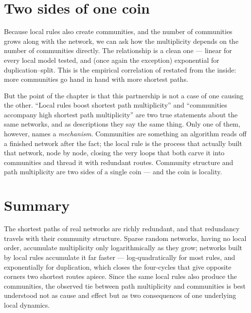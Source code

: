 \section{Two sides of one coin}

Because local rules also create communities, and the number of communities grows
along with the network, we can ask how the multiplicity depends on the number of
communities directly. The relationship is a clean one --- linear for every local
model tested, and (once again the exception) exponential for duplication--split.
This is the empirical correlation of \citet{deng2026} restated from the inside:
more communities go hand in hand with more shortest paths.

But the point of the chapter is that this partnership is not a case of one
causing the other. ``Local rules boost shortest path multiplicity'' and
``communities accompany high shortest path multiplicity'' are two true statements
about the same networks, and as descriptions they say the same thing. Only one of
them, however, names a \emph{mechanism}. Communities are something an algorithm
reads off a finished network after the fact; the local rule is the process that
actually built that network, node by node, closing the very loops that both carve
it into communities and thread it with redundant routes. Community structure and
path multiplicity are two sides of a single coin --- and the coin is locality.

\section{Summary}

The shortest paths of real networks are richly redundant, and that redundancy
travels with their community structure. Sparse random networks, having no local
order, accumulate multiplicity only logarithmically as they grow; networks built
by local rules accumulate it far faster --- log-quadratically for most rules, and
exponentially for duplication, which closes the four-cycles that give opposite
corners two shortest routes apiece. Since the same local rules also produce the
communities, the observed tie between path multiplicity and communities is best
understood not as cause and effect but as two consequences of one underlying
local dynamics.
